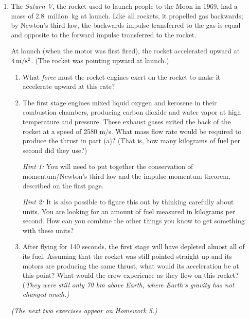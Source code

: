 \documentclass[12pt]{article}
\begin{document}
\begin{enumerate}

	\item The {\it Saturn V}, the rocket used to launch people to the Moon in 1969, had a mass of 2.8~million~kg at launch. Like all rockets, it propelled gas backwards; by Newton's third law, the backwards impulse transferred to the gas is equal and opposite to the forward impulse transferred to the rocket. 

		At launch (when the motor was first fired), the rocket accelerated upward at $4 \, \rm m/\rm s^2$. (The rocket was pointing upward at launch.)

		\begin{enumerate}
			\item What {\it force} must the rocket engines exert on the rocket to make it accelerate upward at this rate?
			
\newpage
			
			\item {The first stage engines mixed liquid oxygen and kerosene in their combustion chambers, producing carbon dioxide and water vapor at high temperature and pressure. These exhaust gases exited the back
				of the rocket at a speed of 2580 m/s. What mass flow rate would be required to produce the thrust in part (a)? (That is, how many kilograms of fuel per second did they use?)

				{\it Hint 1:} You will need to put together the conservation of momentum/Newton's third law and the impulse-momentum theorem, described on the first page.

				{\it Hint 2:} It is also possible to figure this out by thinking carefully about units. You are looking for an amount of fuel measured in kilograms per second. How can you combine the other things you know to get something with these units?
\vspace{3in}
				}
			\item After flying for 140 seconds, the first stage will have depleted almost all of its fuel. Assuming that the rocket was still pointed straight up and its motors are producing the same thrust, what would its acceleration be at this point? What would the crew experience as they flew on this rocket? {(\it They were still only 70 km above Earth, where Earth's gravity has not changed much.)}
		\end{enumerate}

\newpage

		{\it (The next two exercises appear on Homework 5.)}


\end{enumerate}
\end{document}
